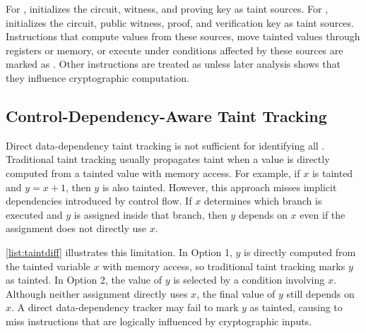 For \pprog, \greyboxfuzz initializes the circuit, witness, and proving key as taint sources. For \vprog, \greyboxfuzz initializes the circuit, public witness, proof, and verification key as taint sources. Instructions that compute values from these sources, move tainted values through registers or memory, or execute under conditions affected by these sources are marked as \cryptobranch. Other instructions are treated as \programbranch unless later analysis shows that they influence cryptographic computation.


\subsection{Control-Dependency-Aware Taint Tracking}
\label{subsec:greybox-control_dependency_taint}

Direct data-dependency taint tracking is not sufficient for identifying all \cryptobranch. Traditional taint tracking usually propagates taint when a value is directly computed from a tainted value with memory access. For example, if \(x\) is tainted and \(y = x + 1\), then \(y\) is also tainted. However, this approach misses implicit dependencies introduced by control flow. If \(x\) determines which branch is executed and \(y\) is assigned inside that branch, then \(y\) depends on \(x\) even if the assignment does not directly use \(x\).

\autoref{list:taintdiff} illustrates this limitation. In Option 1, \(y\) is directly computed from the tainted variable \(x\) with memory access, so traditional taint tracking marks \(y\) as tainted. In Option 2, the value of \(y\) is selected by a condition involving \(x\). Although neither assignment directly uses \(x\), the final value of \(y\) still depends on \(x\). A direct data-dependency tracker may fail to mark \(y\) as tainted, causing \greyboxfuzz to miss instructions that are logically influenced by cryptographic inputs.



